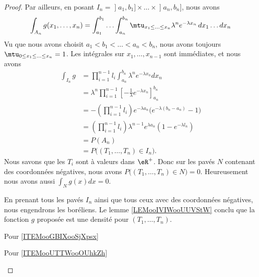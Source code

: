 \begin{proof}
Par ailleurs, en posant \( I_n=\mathopen] a_1 , b_1 \mathclose]\times \ldots\times\mathopen] a_n , b_n \mathclose]\), nous avons
    \begin{equation}
        \int_{A_n}g(x_1,\ldots, x_n)=\int_{a_1}^{b_1}\ldots\int_{a_n}^{b_n}\mtu_{x_1\leq \ldots\leq x_n}\lambda^n e^{-\lambda x_n}\,dx_1\ldots dx_n
    \end{equation}
    Vu que nous avons choisit \( a_1<b_1<\ldots<a_n<b_n\), nous avons toujours \( \mtu_{0\leq x_1\leq\ldots\leq x_n}=1\). Les intégrales sur \( x_1,\ldots, x_{n-1}\) sont immédiates, et nous avons
    \begin{subequations}
        \begin{align}
            \int_{I_n}g&=\prod_{i=1}^{n-1}l_i\int_{a_n}^{b_n}\lambda^n e^{-\lambda x_n}dx_n\\
            &=\lambda^n\prod_{i=1}^{n-1}\left[ -\frac{1}{ \lambda } e^{-\lambda x_n} \right]^{b_n}_{a_n}\\
            &=-(\prod_{i=1}^{n-1}l_i) e^{-\lambda a_n}\big(  e^{-\lambda(b_n-a_n)}-1 \big)\\
            &=(\prod_{i=1}^{n-1}l_i)\lambda^{n-1} e^{\lambda a_n}(1- e^{-\lambda l_n})\\
            &=P(A_n)\\
            &=P\big( (T_1,\ldots, T_n)\in I_n \big).
        \end{align}
    \end{subequations}
    Nous savons que les \( T_i\) sont à valeurs dans \( \eR^+\). Donc sur les pavés \( N\) contenant des coordonnées négatives, nous avons \( P\big( (T_1,\ldots, T_n)\in N \big)=0 \). Heureusement nous avons aussi \( \int_Ng(x)dx=0\).

    En prenant tous les pavés \( I_n\) ainsi que tous ceux avec des coordonnées négatives, nous engendrons les boréliens. Le lemme \ref{LEMooIVIWooUUVStW} conclu que la fonction \( g\) proposée est une densité pour \( (T_1,\ldots, T_n)\).
    

    \begin{center}
        Pour \ref{ITEMooGBIXooSjXpsx}
    \end{center}
    
    \begin{center}
        Pour \ref{ITEMooUTTWooOUhkZh}
    \end{center}
    

\end{proof}
